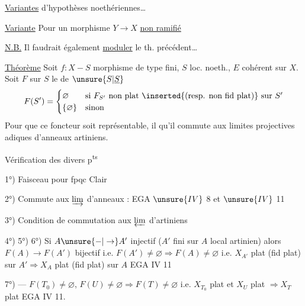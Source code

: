 \uline{Variantes}  d'hypothèses noethériennes\ldots

\uline{Variante} Pour un morphisme $Y\longrightarrow X$ \uline{non ramifié}

\uline{N.B.} Il faudrait également \uline{moduler} le th. précédent\ldots
{}

\uline{Théorème} Soit $f:X-S$ morphisme de type fini, $S$ loc. noeth., $E$ cohérent sur $X$. Soit $F$ sur $S$ le  de $\unsure{S|\underline{S}}$
\[
F(S')=\begin{cases}\varnothing&\text{si }F_{S'}\text{ non plat \inserted{(resp. non fid plat)} sur }S'\\\{\varnothing\}&\text{sinon}\end{cases}
\]
Pour que ce foncteur soit représentable, il  qu'il commute aux limites projectives adiques d'anneaux artiniens.

Vérification des divers p\textsuperscript{ts}

1°) Faisceau pour fpqc Clair

2°) Commute aux $\varinjlim$ d'anneaux : EGA $\unsure{IV}$ 8 et $\unsure{IV}$ 11

3°) Condition de commutation aux $\varprojlim$ d'artiniens

4°) 5°) 6°) Si $A\unsure{-|\to}A'$ injectif ($A'$ fini sur $A$ local artinien) alors $F(A)\longrightarrow F(A')$ bijectif i.e. $F(A')\ne\varnothing\Rightarrow F(A)\ne\varnothing$ i.e. $X_{A'}$ plat (fid plat) sur $A'\Rightarrow X_A$ plat (fid plat) sur $A$ EGA IV 11

7°) --- $F(T_0)\ne\varnothing$, $F(U)\ne\varnothing\Rightarrow F(T)\ne\varnothing$ i.e. $X_{T_0}$ plat et $X_U$ plat $\Rightarrow X_T$ plat EGA IV 11.
